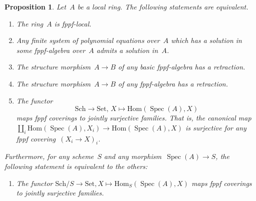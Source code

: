 \documentclass[10pt,reqno,a4paper]{amsbook}
\theoremstyle{definition}
\theoremstyle{plain}
\newtheorem{prop}[defn]{Proposition}
\theoremstyle{remark}
\newcommand{\Hom}{\mathrm{Hom}}
\newcommand{\Set}{\mathrm{Set}}
\newcommand{\Sch}{\mathrm{Sch}}
\DeclareMathOperator{\Spec}{Spec}
\newcommand{\?}{\,{:}\,}
\renewcommand{\_}{\mathpunct{.}\,}
\newcommand{\lra}{\longrightarrow}
\begin{document}
\begin{prop}\label{prop:char-fppf-local-ring}
Let~$A$ be a local ring. The following statements are equivalent.
\begin{enumerate}
\item[(1)] The ring~$A$ is fppf-local.
\item[(1')] Any finite system of polynomial equations over~$A$ which has a
solution in some fppf-algebra over~$A$ admits a solution in~$A$.
\item[(2)] The structure morphism~$A \to B$ of any basic fppf-algebra
has a retraction.
\item[(2')] The structure morphism~$A \to B$ of any
fppf-algebra has a retraction.
\item[(3)] The functor
\[ \Sch \lra \Set,\,X \longmapsto \Hom(\Spec(A), X) \]
maps fppf coverings to jointly surjective families. That is, the canonical
map~$\coprod_i \Hom(\Spec(A), X_i) \to \Hom(\Spec(A), X)$ is surjective for any
fppf covering~$(X_i \to X)_i$.
\end{enumerate}
Furthermore, for any scheme~$S$ and any morphism~$\Spec(A) \to S$, the
following statement is equivalent to the others:
\begin{enumerate}
\item[(4)] The functor
$\Sch/S \to \Set, X \mapsto \Hom_S(\Spec(A), X)$
maps fppf coverings to jointly surjective families.
\end{enumerate}
\end{prop}
\end{document}
